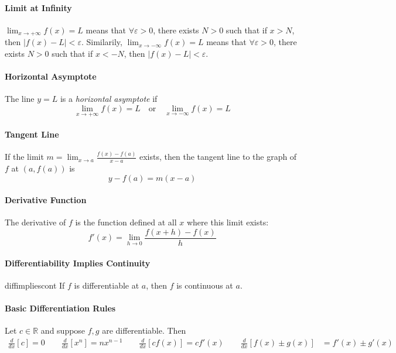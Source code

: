 \documentclass[oneside]{book}
\begin{document}
\paragraph{Limit at Infinity}{
    $\lim_{x\to +\infty}f(x)=L$ means that $\forall \varepsilon>0$, there exists $N>0$ such that if $x>N$, then $|f(x)-L|<\varepsilon$. Similarily,
    $ \lim_{x\to -\infty}f(x)=L$ means that $\forall \varepsilon>0$, there exists $N>0$ such that if $x<-N$, then $|f(x)-L|<\varepsilon$. 
}

\paragraph{Horizontal Asymptote}{
    The line $y=L$ is a \emph{horizontal asymptote} if
    \[
        \lim_{x\to +\infty}f(x)=L
        \quad\text{or}\quad
        \lim_{x\to -\infty}f(x)=L
    \]
}

\paragraph{Tangent Line}{
    If the limit $m=\lim_{x\to a}\frac{f(x)-f(a)}{x-a}$
    exists, then the tangent line to the graph of $f$ at $(a,f(a))$ is
    \[
        y-f(a)=m(x-a)
    \]
}



\paragraph{Derivative Function}{
    The derivative of $f$ is the function defined at all $x$ where this limit exists: 
    \[
        f'(x)=\lim_{h\to 0}\frac{f(x+h)-f(x)}{h}
    \]
}

\paragraph{Differentiability Implies Continuity}{diffimpliescont}{
    If $f$ is differentiable at $a$, then $f$ is continuous at $a$.
}


\paragraph{Basic Differentiation Rules}{
    Let $c\in\mathbb{R}$ and suppose $f,g$ are differentiable. Then
    \begin{align*}
        \frac{d}{dx}[c] =0 \qquad 
        \frac{d}{dx}[x^n] = nx^{n-1} \qquad
        \frac{d}{dx}[cf(x)] = c f'(x) \qquad
        \frac{d}{dx}[f(x) \pm g(x)] &= f'(x) \pm g'(x)
    \end{align*}
}
\end{document}
